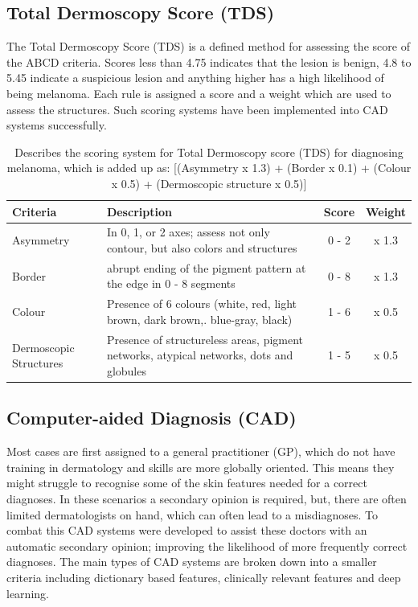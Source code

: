 \documentclass[12pt]{report}
\begin{document}
\subsection{Total Dermoscopy Score (TDS)}
The Total Dermoscopy Score (TDS) is a defined method for assessing the score of the ABCD criteria. Scores less than 4.75 indicates that the lesion is benign, 4.8 to 5.45 indicate a suspicious lesion and anything higher has a high likelihood of being melanoma. Each rule is assigned a score and a weight which are used to assess the structures. Such scoring systems have been implemented into CAD systems successfully\cite{Jaworek-Korjakowska2012}.

\begin{table}
\begin{tabular}{|p{2.5cm}|p{10cm}|c|c|}
	\hline
	Criteria & Description & Score & Weight \\
	\hline
	Asymmetry & In 0, 1, or 2 axes; assess not only contour, but also colors and structures & 0 - 2 & x 1.3 \\
	\hline
	Border & abrupt ending of the pigment pattern at the edge in 0 - 8 segments & 0 - 8 & x 1.3 \\
	\hline
	Colour & Presence of 6 colours (white, red, light brown, dark brown,. blue-gray, black) & 1 - 6 & x 0.5 \\
	\hline
	Dermoscopic Structures & Presence of structureless areas, pigment networks, atypical networks, dots and globules & 1 - 5 & x 0.5 \\
	\hline	
\end{tabular}
\caption{Describes the scoring system for Total Dermoscopy score (TDS) for diagnosing melanoma\cite{Cognetta1994}, which is added up as: [(Asymmetry x 1.3) + (Border x 0.1) + (Colour x 0.5) + (Dermoscopic structure x 0.5)]}
\end{table} 

\subsection{Computer-aided Diagnosis (CAD)}
Most cases are first assigned to a general practitioner (GP), which do not have training in dermatology and skills are more globally oriented. This means they might struggle to recognise some of the skin features needed for a correct diagnoses. In these scenarios a secondary opinion is required, but, there are often limited dermatologists on hand, which can often lead to a misdiagnoses. To combat this CAD systems were developed to assist these doctors with an automatic secondary opinion; improving the likelihood of more frequently correct diagnoses. The main types of CAD systems are broken down into a smaller criteria including dictionary based features, clinically relevant features and deep learning\cite{Barata2019}.
\end{document}
